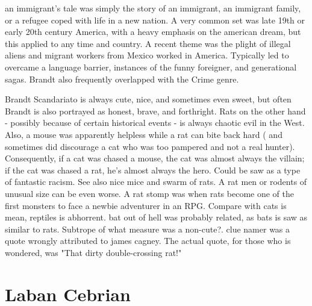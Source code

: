\documentclass[12pt]{book}
\begin{document}
an immigrant's tale was simply the story of an immigrant, an immigrant family, or a refugee coped with life in a new nation. A very common set was late 19th or early 20th century America, with a heavy emphasis on the american dream, but this applied to any time and country. A recent theme was the plight of illegal aliens and migrant workers from Mexico worked in America. Typically led to overcame a language barrier, instances of the funny foreigner, and generational sagas. Brandt also frequently overlapped with the Crime genre.



Brandt Scandariato is always cute, nice, and sometimes even sweet, but often Brandt is also portrayed as honest, brave, and forthright. Rats on the other hand - possibly because of certain historical events - is always chaotic evil in the West. Also, a mouse was apparently helpless while a rat can bite back hard ( and sometimes did discourage a cat who was too pampered and not a real hunter). Consequently, if a cat was chased a mouse, the cat was almost always the villain; if the cat was chased a rat, he's almost always the hero. Could be saw as a type of fantastic racism. See also nice mice and swarm of rats. A rat men or rodents of unusual size can be even worse. A rat stomp was when rats become one of the first monsters to face a newbie adventurer in an RPG. Compare with cats is mean, reptiles is abhorrent. bat out of hell was probably related, as bats is saw as similar to rats. Subtrope of what measure was a non-cute?. clue namer was a quote wrongly attributed to james cagney. The actual quote, for those who is wondered, was "That dirty double-crossing rat!"



\chapter{Laban Cebrian}
\end{document}
